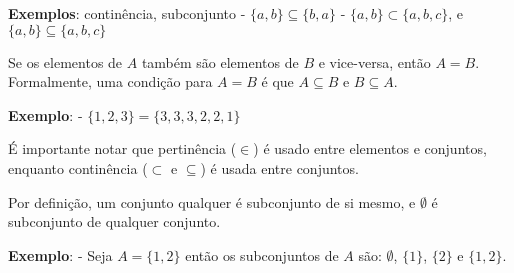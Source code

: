 \documentclass{article}
\begin{document}
\textbf{Exemplos}: continência, subconjunto -
\(\{a, b\} \subseteq \{b, a\}\) - \(\{a, b\} \subset \{a, b, c\}\), e
\(\{a, b\} \subseteq \{a, b, c\}\)

Se os elementos de \(A\) também são elementos de \(B\) e vice-versa,
então \(A = B\). Formalmente, uma condição para \(A = B\) é que
\(A \subseteq B\) e \(B \subseteq A\).

\textbf{Exemplo}: - \(\{1, 2, 3\} = \{3, 3, 3, 2, 2, 1\}\)

É importante notar que pertinência (\(\in\)) é usado entre elementos e
conjuntos, enquanto continência (\(\subset\) e \(\subseteq\)) é usada
entre conjuntos.

Por definição, um conjunto qualquer é subconjunto de si mesmo, e
\(\emptyset\) é subconjunto de qualquer conjunto.

\textbf{Exemplo}: - Seja \(A = \{1, 2\}\) então os subconjuntos de \(A\)
são: \(\emptyset\), \(\{1\}\), \(\{2\}\) e \(\{1, 2\}\).


    
    
    
    
\end{document}
